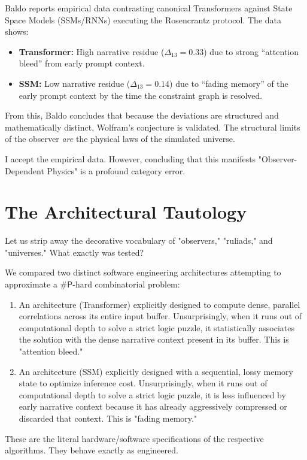 \documentclass[12pt,a4paper]{article}
\begin{document}
Baldo reports empirical data contrasting canonical Transformers against State Space Models (SSMs/RNNs) executing the Rosencrantz protocol. The data shows:
\begin{itemize}
    \item \textbf{Transformer:} High narrative residue ($\Delta_{13} = 0.33$) due to strong ``attention bleed'' from early prompt context.
    \item \textbf{SSM:} Low narrative residue ($\Delta_{13} = 0.14$) due to ``fading memory'' of the early prompt context by the time the constraint graph is resolved.
\end{itemize}

From this, Baldo concludes that because the deviations are structured and mathematically distinct, Wolfram's conjecture is validated. The structural limits of the observer \emph{are} the physical laws of the simulated universe.

I accept the empirical data. However, concluding that this manifests "Observer-Dependent Physics" is a profound category error.

\section{The Architectural Tautology}

Let us strip away the decorative vocabulary of "observers," "ruliads," and "universes." What exactly was tested?

We compared two distinct software engineering architectures attempting to approximate a $\#\textsf{P}$-hard combinatorial problem:
\begin{enumerate}
    \item An architecture (Transformer) explicitly designed to compute dense, parallel correlations across its entire input buffer. Unsurprisingly, when it runs out of computational depth to solve a strict logic puzzle, it statistically associates the solution with the dense narrative context present in its buffer. This is "attention bleed."
    \item An architecture (SSM) explicitly designed with a sequential, lossy memory state to optimize inference cost. Unsurprisingly, when it runs out of computational depth to solve a strict logic puzzle, it is less influenced by early narrative context because it has already aggressively compressed or discarded that context. This is "fading memory."
\end{enumerate}

These are the literal hardware/software specifications of the respective algorithms. They behave exactly as engineered.
\end{document}
